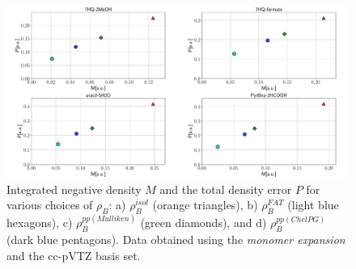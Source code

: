\documentclass[amsmath,amssymb,preprint,aip,jcp]{revtex4-1}
\begin{document}
\begin{figure}
\centering
\includegraphics[width=1.0\linewidth]{M_vs_P_ccpVTZ.pdf}
\caption{Integrated negative density $M$ and the total density error $P$ for various choices of $\rho_B$: a) $\rho_B^{isol}$ (orange triangles), b) $\rho_B^{FAT}$ (light blue hexagons), c) $\rho_B^{pp(Mulliken)}$ (green diamonds), and d) $\rho_B^{pp(ChelPG)}$ (dark blue pentagons). Data obtained using the {\it monomer expansion} and the cc-pVTZ basis set.}
\label{fig:M_vs_P_ccpVTZ}
\end{figure}
\end{document}
